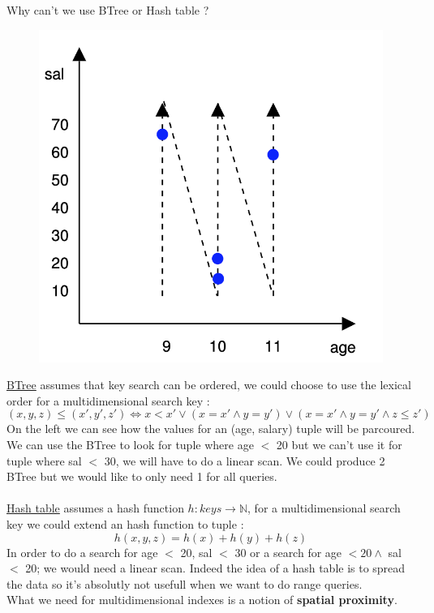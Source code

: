 \documentclass[12pt,a4paper]{article}
\begin{document}
Why can't we use BTree or Hash table ?\\
\begin{figure}
\vspace{-10mm}
\includegraphics[scale=0.37]{img/img52.png}
\end{figure}
\underline{BTree} assumes that key search can be ordered, we could choose to use the lexical order for a multidimensional search key : $$(x,y,z) \leq (x',y',z') \Leftrightarrow x < x' \vee (x=x' \wedge y=y') \vee (x=x' \wedge y=y' \wedge z\leq z')$$
On the left we can see how the values for an (age, salary) tuple will be parcoured. We can use the BTree to look for tuple where age $<$ 20 but we can't use it for tuple where sal $<$ 30, we will have to do a linear scan. We could produce 2 BTree but we would like to only need 1 for all queries.\\
\\
\underline{Hash table} assumes a hash function $h : keys \rightarrow \mathbb{N}$, for a multidimensional search key we could extend an hash function to tuple : 
$$h(x,y,z) = h(x) + h(y) + h(z)$$
In order to do a search for age $<$ 20, sal $<$ 30 or a search for age $< 20 \wedge$ sal $<$ 20; we would need a linear scan. Indeed the idea of a hash table is to spread the data so it's absolutly not usefull when we want to do range queries.\\
What we need for multidimensional indexes is a notion of \textbf{spatial proximity}. \\
\end{document}
